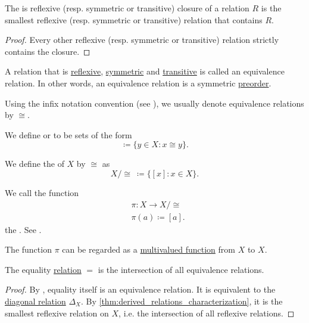 \begin{proposition}\label{thm:derived_relations_characterization}
  The is reflexive (resp. symmetric or transitive) closure of a relation \( R \) is the smallest reflexive (resp. symmetric or transitive) relation that contains \( R \).
\end{proposition}
\begin{proof}
  Every other reflexive (resp. symmetric or transitive) relation strictly contains the closure.
\end{proof}

\begin{definition}\label{def:equivalence_relation}
  A relation that is \hyperref[def:binary_relation/reflexive]{reflexive}, \hyperref[def:binary_relation/symmetric]{symmetric} and \hyperref[def:binary_relation/transitive]{transitive} is called an equivalence relation. In other words, an equivalence relation is a symmetric \hyperref[def:preordered_set]{preorder}.

  Using the infix notation convention (see ), we usually denote equivalence relations by \( \cong \).

  \begin{defenum}
     We define  or  to be sets of the form
    \begin{equation*}
      [x] \coloneqq \{ y \in X \colon x \cong y \}.
    \end{equation*}

     We define the  of \( X \) by \( \cong \) as
    \begin{equation*}
      X / \cong \ \coloneqq \{ [x] \colon x \in X \}.
    \end{equation*}

     We call the function
    \begin{align*}
      &\pi: X \to X / \cong \\
      &\pi(a) \coloneqq [a].
    \end{align*}
    the . See .

    The function \( \pi \) can be regarded as a \hyperref[def:function/multivalued]{multivalued function} from \( X \) to \( X \).
  \end{defenum}
\end{definition}

\begin{proposition}\label{thm:equality_is_smallest_equivalence_relation}
  The equality \hyperref[def:relation]{relation} \( = \) is the intersection of all equivalence relations.
\end{proposition}
\begin{proof}
  By , equality itself is an equivalence relation. It is equivalent to the \hyperref[def:binary_relation/diagonal]{diagonal relation} \( \Delta_X \). By \cref{thm:derived_relations_characterization}, it is the smallest reflexive relation on \( X \), i.e. the intersection of all reflexive relations.
\end{proof}

